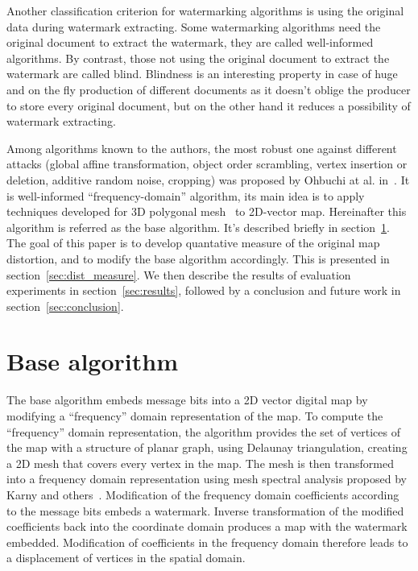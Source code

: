\documentclass{article}
\begin{document}
Another classification criterion for watermarking algorithms is using the original data during watermark extracting. Some watermarking algorithms need the original document to extract the watermark, 
they are called well-informed algorithms. By contrast, those not using the original document to extract the watermark are called blind.
Blindness is an interesting property in case of huge and on the fly production of different documents as it doesn't oblige the producer to store every original document, 
but on the other hand it reduces a possibility of watermark extracting.

Among algorithms known to the authors, the most robust one against different attacks (global affine transformation, object order scrambling, vertex insertion or deletion, additive random noise, cropping)
was proposed by Ohbuchi at al. in~\cite{Ohbuchi}. It is well-informed ``frequency-domain'' algorithm, its main idea is to apply techniques developed for 3D polygonal mesh~\cite{Ohbuchi3D} to 2D-vector map. 
Hereinafter this algorithm is referred as the base algorithm. It's described briefly in section~\ref{sec:base}. The goal of this paper is to develop quantative measure of the original map distortion, 
and to modify the base algorithm accordingly.
This is presented in section~\ref{sec:dist_measure}. We then describe the results of evaluation experiments in section~\ref{sec:results}, 
followed by a conclusion and future work in section~\ref{sec:conclusion}.

\section{Base algorithm}
\label{sec:base}
The base algorithm embeds message bits into a 2D vector digital map by modifying a ``frequency'' domain representation of the map. 
To compute the ``frequency'' domain representation, the algorithm provides the set of vertices of the map with a structure of planar graph, using Delaunay triangulation, creating a 2D mesh that covers every vertex in the map.
The mesh is then transformed into a frequency domain representation using mesh spectral analysis proposed by Karny and others~\cite{Karni1, Karni2}. Modification of the frequency domain coefficients 
according to the message bits embeds a watermark. Inverse transformation of the modified coefficients back into the coordinate domain produces a map with the watermark embedded. Modification of coefficients in the
frequency domain therefore leads to a displacement of vertices in the spatial domain.
\end{document}
